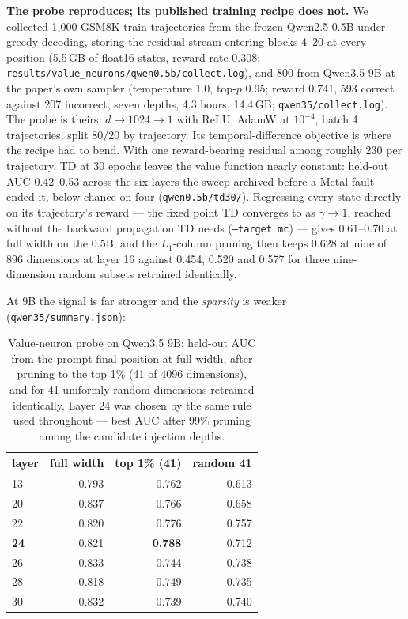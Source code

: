 \documentclass[11pt]{article}
\newcommand{\code}[1]{\texttt{#1}}
\begin{document}
\textbf{The probe reproduces; its published training recipe does not.} We collected 1,000 GSM8K-train trajectories from the frozen Qwen2.5-0.5B under greedy decoding, storing the residual stream entering blocks 4--20 at every position (5.5\,GB of float16 states, reward rate 0.308; \code{results/value\_neurons/qwen0.5b/collect.log}), and 800 from Qwen3.5 9B at the paper's own sampler (temperature 1.0, top-$p$ 0.95; reward 0.741, 593 correct against 207 incorrect, seven depths, 4.3 hours, 14.4\,GB; \code{qwen35/collect.log}). The probe is theirs: $d \to 1024 \to 1$ with ReLU, AdamW at $10^{-4}$, batch 4 trajectories, split 80/20 by trajectory. Its temporal-difference objective is where the recipe had to bend. With one reward-bearing residual among roughly 230 per trajectory, TD at 30 epochs leaves the value function nearly constant: held-out AUC 0.42--0.53 across the six layers the sweep archived before a Metal fault ended it, below chance on four (\code{qwen0.5b/td30/}). Regressing every state directly on its trajectory's reward --- the fixed point TD converges to as $\gamma \to 1$, reached without the backward propagation TD needs (\code{--target mc}) --- gives 0.61--0.70 at full width on the 0.5B, and the $L_1$-column pruning then keeps 0.628 at nine of 896 dimensions at layer 16 against 0.454, 0.520 and 0.577 for three nine-dimension random subsets retrained identically.

At 9B the signal is far stronger and the \emph{sparsity} is weaker (\code{qwen35/summary.json}):

\begin{table}[t]
\centering
\caption{Value-neuron probe on Qwen3.5 9B: held-out AUC from the prompt-final position at full width, after pruning to the top 1\% (41 of 4096 dimensions), and for 41 uniformly random dimensions retrained identically. Layer 24 was chosen by the same rule used throughout --- best AUC after 99\% pruning among the candidate injection depths.}
\label{tab:vn9b}
\small
\begin{tabular}{lrrr}
\toprule
layer & full width & top 1\% (41) & random 41 \\
\midrule
13 & 0.793 & 0.762 & 0.613 \\
20 & 0.837 & 0.766 & 0.658 \\
22 & 0.820 & 0.776 & 0.757 \\
\textbf{24} & 0.821 & \textbf{0.788} & 0.712 \\
26 & 0.833 & 0.744 & 0.738 \\
28 & 0.818 & 0.749 & 0.735 \\
30 & 0.832 & 0.739 & 0.740 \\
\bottomrule
\end{tabular}
\end{table}
\end{document}
